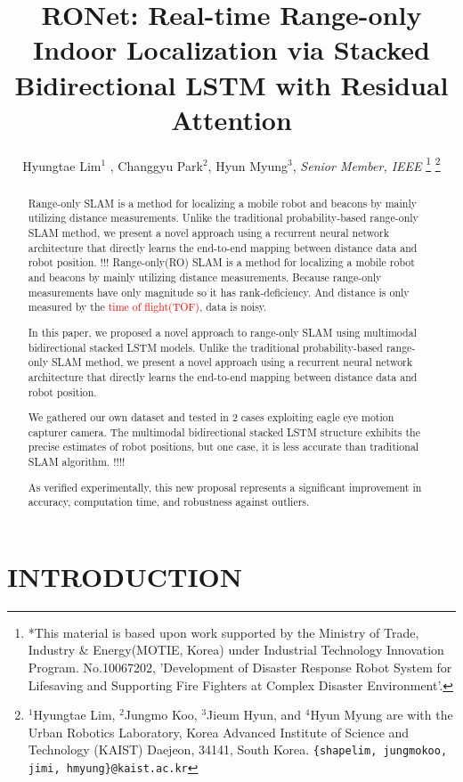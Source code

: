 \documentclass[letterpaper, 10 pt, conference]{ieeeconf}  %
\title{\LARGE \bf
RONet: Real-time Range-only Indoor Localization via Stacked Bidirectional LSTM with Residual Attention}
\author{Hyungtae Lim$^{1}$ , Changgyu Park$^{2}$, Hyun Myung$^{3}$, \textit{Senior Member, IEEE}%
\thanks{
	*This material is based upon work supported by the Ministry of Trade, Industry \& Energy(MOTIE, Korea) under Industrial Technology Innovation Program. No.10067202, 'Development of Disaster Response Robot System for Lifesaving and Supporting Fire Fighters at Complex Disaster Environment'.}%
\thanks{$^{1}$Hyungtae Lim, $^{2}$Jungmo Koo, $^{3}$Jieum Hyun, and $^{4}$Hyun Myung are with
	the Urban Robotics Laboratory, Korea Advanced Institute of Science
	and Technology (KAIST) Daejeon, 34141, South Korea. {\tt\small \{shapelim, jungmokoo, jimi, hmyung\}@kaist.ac.kr}}%
%
}
\begin{document}


\maketitle
\thispagestyle{empty}
\pagestyle{empty}


\begin{abstract}



Range-only SLAM is a method for localizing a mobile robot and beacons by mainly utilizing distance measurements. Unlike the traditional probability-based range-only SLAM method, we present a novel approach using a recurrent neural network architecture that directly learns the end-to-end mapping between distance data and robot position.
!!!
Range-only(RO) SLAM is a method for localizing a mobile robot and beacons by mainly utilizing distance measurements. Because range-only measurements have only magnitude so it has rank-deficiency. And distance is only measured by the \textcolor{red}{time of flight(TOF)}, data is noisy.

In this paper, we proposed a novel approach to range-only SLAM using multimodal bidirectional stacked LSTM models. Unlike the traditional probability-based range-only SLAM method, we present a novel approach using a recurrent neural network architecture that directly learns the end-to-end mapping between distance data and robot position.

We gathered our own dataset and tested in 2 cases exploiting eagle eye motion capturer camera. The multimodal bidirectional stacked LSTM structure exhibits the precise estimates of robot positions, but one case, it is less accurate than traditional SLAM algorithm. 
!!!!

As verified experimentally, this new proposal represents a significant improvement in accuracy, computation time, and robustness against outliers.

\end{abstract}


\section{INTRODUCTION}
\end{document}
